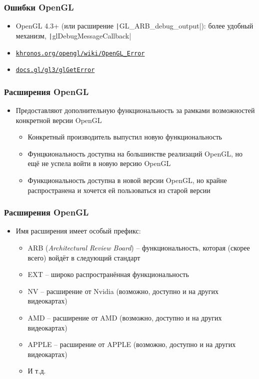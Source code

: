 \documentclass[10pt]{beamer}
\begin{document}
\begin{frame}[fragile]
\frametitle{Ошибки OpenGL}
\begin{itemize}
\item OpenGL 4.3+ (или расширение \texttt|GL_ARB_debug_output|): более удобный механизм, \texttt|glDebugMessageCallback|
\pause
\item \href{https://www.khronos.org/opengl/wiki/OpenGL_Error}{\texttt{khronos.org/opengl/wiki/OpenGL\_Error}}
\item \href{https://docs.gl/gl3/glGetError}{\texttt{docs.gl/gl3/glGetError}}
\end{itemize}
\end{frame}

\begin{frame}[fragile]
\frametitle{Расширения OpenGL}
\begin{itemize}
\item Предоставляют дополнительную функциональность за рамками возможностей конкретной версии OpenGL
\pause
\begin{itemize}
\item Конкретный производитель выпустил новую функциональность
\pause
\item Фунцкиональность доступна на большинстве реализаций OpenGL, но ещё не успела войти в новую версию OpenGL
\pause
\item Функциональность доступна в новой версии OpenGL, но крайне распространена и хочется ей пользоваться из старой версии
\end{itemize}
\end{itemize}
\end{frame}

\begin{frame}[fragile]
\frametitle{Расширения OpenGL}
\begin{itemize}
\item Имя расширения имеет особый префикс:
\pause
\begin{itemize}
\item ARB (\textit{Architectural Review Board}) -- функциональность, которая (скорее всего) войдёт в следующий стандарт
\pause
\item EXT -- широко распространённая функциональность
\pause
\item NV -- расширение от Nvidia (возможно, доступно и на других видеокартах)
\pause
\item AMD -- расширение от AMD (возможно, доступно и на других видеокартах)
\pause
\item APPLE -- расширение от APPLE (возможно, доступно и на других видеокартах)
\pause
\item И т.д.
\end{itemize}
\end{itemize}
\end{frame}
\end{document}
